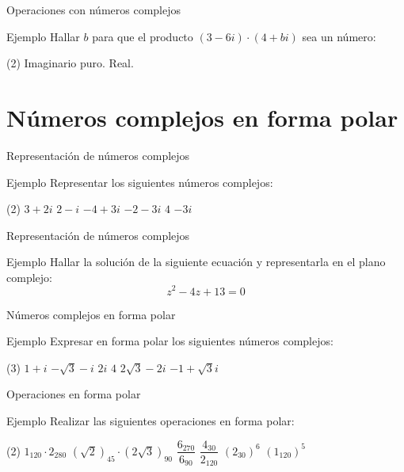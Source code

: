 \documentclass[8pt]{beamer}
\begin{document}
\begin{frame}[t]{Operaciones con números complejos}
\begin{exampleblock}{Ejemplo}
Hallar  $b$ para que el producto  $(3-6i)\cdot(4+bi)$ sea un número:
\begin{tasks}[label=\alph*)](2)
\task Imaginario puro.
\task Real.
\end{tasks}
\end{exampleblock}

\end{frame}

\section{Números complejos en forma polar}
\begin{frame}[t]{Representación de números complejos}
\begin{exampleblock}{Ejemplo}
Representar los siguientes números complejos:
\begin{tasks}[label=\alph*)](2)
\task $3+2i$
\task $2-i$
\task $-4+3i$
\task $-2-3i$
\task $4$
\task $-3i$
\end{tasks}
\end{exampleblock}


\end{frame}

\begin{frame}[t]{Representación de números complejos}
\begin{exampleblock}{Ejemplo}
Hallar la solución de la siguiente ecuación y representarla en el plano complejo:
\[ z^2-4z+13=0 \]
\end{exampleblock}
\end{frame}

\begin{frame}[t]{Números complejos en forma polar}
\begin{exampleblock}{Ejemplo}
Expresar en forma polar los siguientes números complejos:
\begin{tasks}[label=\alph*)](3)
\task $1+i$
\task $-\sqrt{3}-i$
\task $2i$
\task $4$
\task $2\sqrt{3}-2i$
\task $-1+\sqrt{3}i$
\end{tasks}
\end{exampleblock}

\end{frame}

\begin{frame}[t]{Operaciones en forma polar}
\begin{exampleblock}{Ejemplo}
Realizar las siguientes operaciones en forma polar:
\begin{tasks}[label=\alph*)](2)
\task $1_{120} \cdot 2_{280}$
\task $\left(\sqrt{2} \right)_{45} \cdot \left( 2\sqrt{3} \right)_{90}$
\task $\dfrac{6_{270}}{6_{90}}$
\task $\dfrac{4_{30}}{2_{120}}$
\task $\left( 2_{30}\right)^6$
\task $\left( 1_{120}\right)^5$
\end{tasks}
\end{exampleblock}
\end{frame}
\end{document}
